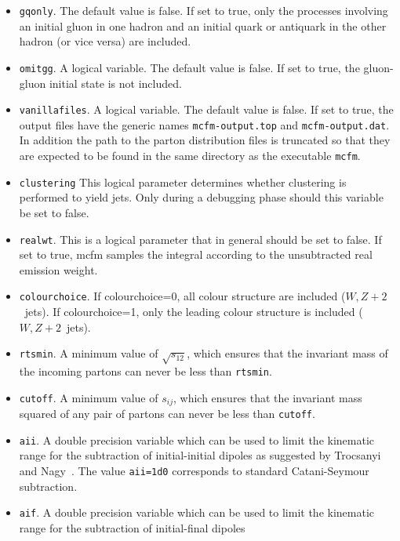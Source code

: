 \documentclass[12pt]{article}
\begin{document}
\begin{itemize}
\item {\tt gqonly}.  
The default value is false. If set to true, 
only the processes
involving an initial gluon in one hadron and an initial quark
or antiquark in the other hadron (or vice versa) are included.
\item {\tt omitgg}.  
A logical variable. 
The default value is false. If set to true, the gluon-gluon
initial state is not included.
\item {\tt vanillafiles}.  
A logical variable. The default value is false. If set to true, 
the output files have the generic names 
{\tt mcfm-output.top} and {\tt mcfm-output.dat}. In addition
the path to the parton distribution files is truncated so that
they are expected to be found in the same directory as the executable
{\tt mcfm}.
\item {\tt clustering}
This logical parameter determines whether clustering is performed to yield
jets. Only during a debugging phase should this variable be set to false. 
\item {\tt realwt}.  
This is a logical parameter that in general should be set to false.
If set to true, mcfm samples the integral according to the
unsubtracted real emission weight.
\item {\tt colourchoice}.  
If colourchoice=0, all colour structure are included ($W,Z+2$~jets).
If colourchoice=1, only the leading 
colour structure is included ($W,Z+2$~jets).
\item {\tt rtsmin}.  
A minimum value of $\sqrt{s_{12}}$, which ensures that the invariant mass
of the incoming partons can never be less than {\tt rtsmin}.
\item {\tt cutoff}.  
A minimum value of $s_{ij}$, which ensures that the invariant mass squared
of any pair of partons can never be less than {\tt cutoff}.
\item {\tt aii}.  
A double precision variable which can be used to
limit the kinematic range for the subtraction of initial-initial dipoles
as suggested by Trocsanyi and Nagy~\cite{Nagy:2003tz}.   
The value {\tt aii=1d0} corresponds 
to standard Catani-Seymour subtraction.
\item {\tt aif}.  
A double precision variable which can be used to
limit the kinematic range for the subtraction of initial-final dipoles

\end{itemize}
\end{document}
